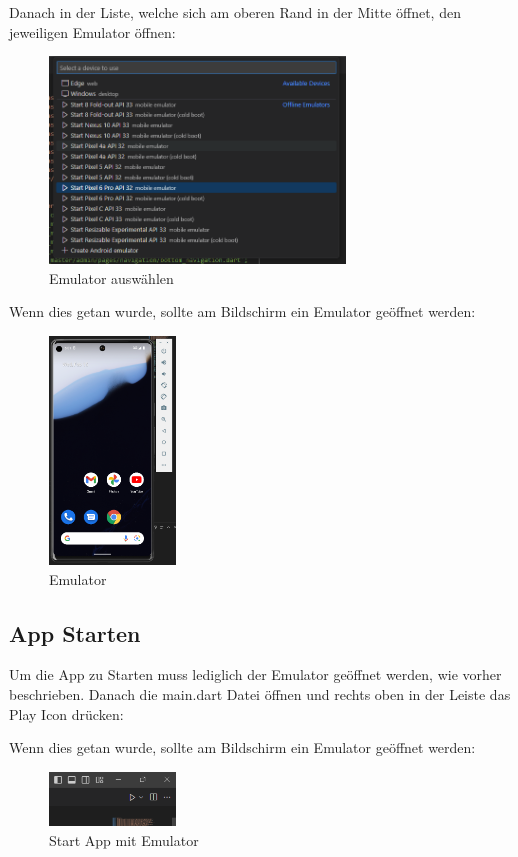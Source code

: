 Danach in der Liste, welche sich am oberen Rand in der Mitte öffnet, den jeweiligen Emulator öffnen:
\begin{figure}[!h]
\centering
\vspace{0.5cm}
\includegraphics[width=0.7\textwidth]{FLUTTER/images/ZB/emulator_auswaehlen.png}
\caption{Emulator auswählen}
\end{figure}

\newpage

Wenn dies getan wurde, sollte am Bildschirm ein Emulator geöffnet werden:
\begin{figure}[!h]
\centering
\includegraphics[width=0.3\textwidth]{FLUTTER/images/ZB/gestartetter_emulator.png}
\caption{Emulator}
\end{figure}

\subsection{App Starten}
Um die App zu Starten muss lediglich der Emulator geöffnet werden, wie vorher beschrieben. Danach die main.dart Datei öffnen und rechts oben in der Leiste das Play Icon drücken:

Wenn dies getan wurde, sollte am Bildschirm ein Emulator geöffnet werden:
\begin{figure}[!h]
\centering
\includegraphics[width=0.3\textwidth]{FLUTTER/images/ZB/start_emulator.png}
\caption{Start App mit Emulator}
\end{figure}

